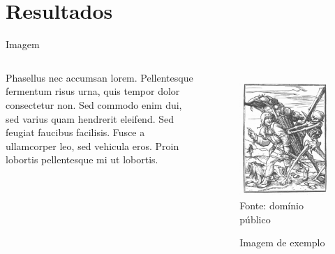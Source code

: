 \documentclass[17pt, c]{beamer}
\begin{document}
\section{Resultados}
\insertsectionpage
\begin{frame}{Imagem}
\begin{columns}
	Phasellus nec accumsan lorem. Pellentesque fermentum risus urna, quis tempor dolor consectetur non. Sed commodo enim dui, sed varius quam hendrerit eleifend. Sed feugiat faucibus facilisis. Fusce a ullamcorper leo, sed vehicula eros. Proin lobortis pellentesque mi ut lobortis.
	
	\begin{figure}
		\vspace{-1cm}
		\caption{Imagem de exemplo}
		\includegraphics[scale=0.225]{imgs/Holbein_Danse_Macabre}\\
		Fonte: domínio público
	\end{figure}%
\end{columns}
\end{frame}
\end{document}
